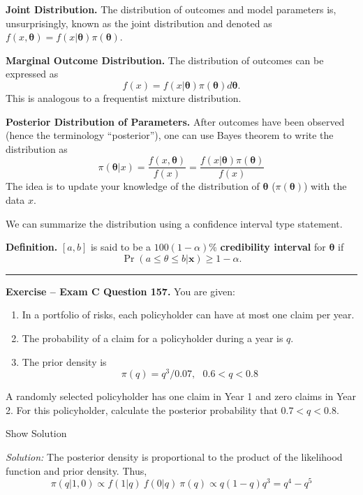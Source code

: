 \documentclass[]{book}
\providecommand{\tightlist}{%
  \setlength{\itemsep}{0pt}\setlength{\parskip}{0pt}}
\theoremstyle{definition}
\theoremstyle{definition}
\theoremstyle{definition}
\theoremstyle{remark}
\begin{document}
\textbf{Joint Distribution.} The distribution of outcomes and model
parameters is, unsurprisingly, known as the joint distribution and
denoted as
\(f(x , \boldsymbol \theta) = f(x|\boldsymbol \theta )\pi(\boldsymbol \theta)\).

\textbf{Marginal Outcome Distribution.} The distribution of outcomes can
be expressed as
\[f(x) = f(x | \boldsymbol \theta)\pi(\boldsymbol \theta) d\boldsymbol \theta.\]
This is analogous to a frequentist mixture distribution.

\textbf{Posterior Distribution of Parameters.} After outcomes have been
observed (hence the terminology ``posterior''), one can use Bayes
theorem to write the distribution as
\[\pi(\boldsymbol \theta | x) =\frac{f(x , \boldsymbol \theta)}{f(x)} =\frac{f(x|\boldsymbol \theta )\pi(\boldsymbol \theta)}{f(x)}\]
The idea is to update your knowledge of the distribution of
\(\boldsymbol \theta\) (\(\pi(\boldsymbol \theta)\)) with the data
\(x\).

We can summarize the distribution using a confidence interval type
statement.

\textbf{Definition.} \([a,b]\) is said to be a \(100(1-\alpha)\%\)
\textbf{credibility interval} for \(\boldsymbol \theta\) if
\[\Pr (a \le \theta \le b | \mathbf{x}) \ge 1- \alpha.\]

\begin{center}\rule{0.5\linewidth}{\linethickness}\end{center}

\textbf{Exercise -- Exam C Question 157.} You are given:

\begin{enumerate}
\def\labelenumi{(\roman{enumi})}
\tightlist
\item
  In a portfolio of risks, each policyholder can have at most one claim
  per year.
\item
  The probability of a claim for a policyholder during a year is \(q\).
\item
  The prior density is \[\pi(q) = q^3/0.07, \ \ \ 0.6 < q < 0.8\]
\end{enumerate}

A randomly selected policyholder has one claim in Year 1 and zero claims
in Year 2. For this policyholder, calculate the posterior probability
that \(0.7 < q < 0.8\).

Show Solution

\hypertarget{toggleExamC157}{}
\emph{Solution:} The posterior density is proportional to the product of
the likelihood function and prior density. Thus,
\[\pi(q|1,0) \propto f(1|q)\ f(0|q)\ \pi(q) \propto q(1-q)q^3 = q^4-q^5\]
\end{document}
